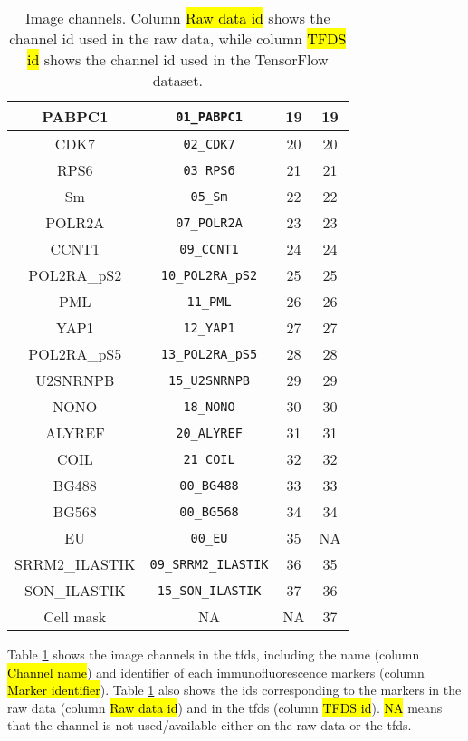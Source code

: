 \begin{table}[!ht]
{\begin{tabular}{c|c|c|c}
    \hline
    PABPC1 & \texttt{01\_PABPC1} & 19 & 19 \\
    \hline
    CDK7 & \texttt{02\_CDK7} & 20 & 20 \\
    \hline
    RPS6 & \texttt{03\_RPS6} & 21 & 21 \\
    \hline
    Sm & \texttt{05\_Sm} & 22 & 22 \\
    \hline
    POLR2A & \texttt{07\_POLR2A} & 23 & 23 \\
    \hline
    CCNT1 & \texttt{09\_CCNT1} & 24 & 24 \\
    \hline
    POL2RA\_pS2 & \texttt{10\_POL2RA\_pS2} & 25 & 25 \\
    \hline
    PML & \texttt{11\_PML} & 26 & 26 \\
    \hline
    YAP1 & \texttt{12\_YAP1} & 27 & 27 \\
    \hline
    POL2RA\_pS5 & \texttt{13\_POL2RA\_pS5} & 28 & 28 \\
    \hline
    U2SNRNPB & \texttt{15\_U2SNRNPB} & 29 & 29 \\
    \hline
    NONO & \texttt{18\_NONO} & 30 & 30 \\
    \hline
    ALYREF & \texttt{20\_ALYREF} & 31 & 31 \\
    \hline
    COIL & \texttt{21\_COIL} & 32 & 32 \\
    \hline
    BG488 & \texttt{00\_BG488} & 33 & 33 \\
    \hline
    BG568 & \texttt{00\_BG568} & 34 & 34 \\
    \hline
    EU & \texttt{00\_EU} & 35 & NA \\
    \hline
    SRRM2\_ILASTIK & \texttt{09\_SRRM2\_ILASTIK} & 36 & 35 \\
    \hline
    SON\_ILASTIK & \texttt{15\_SON\_ILASTIK} & 37 & 36 \\
    \hline
    Cell mask & NA & NA & 37 \\
    \hline
  \end{tabular}%
  }
  \caption{Image channels. Column \hl{Raw data id} shows the channel id used in the raw data, while column \hl{TFDS id} shows the channel id used in the TensorFlow dataset.}
  \label{table:data_pp:channels}
\end{table}

Table \ref{table:data_pp:channels} shows the image channels in the \gls{tfds}, including the name (column \hl{Channel name}) and identifier of each immunofluorescence markers (column \hl{Marker identifier}). Table \ref{table:data_pp:channels} also shows the ids corresponding to the markers in the raw data (column \hl{Raw data id}) and in the \gls{tfds} (column \hl{TFDS id}). \hl{NA} means that the channel is not used/available either on the raw data or the \gls{tfds}.

